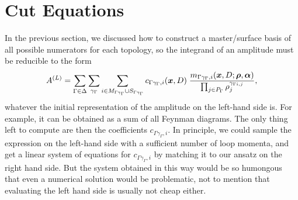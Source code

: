 \section{Cut Equations}
\label{sec:cut_equations}
{

In the previous section, we discussed how to construct a master/surface basis
of all possible numerators for each topology, so the integrand of an amplitude must 
be reducible to the form
\begin{equation} \label{eq:unitarity_ansatz}
  A^{(L)} =  
  \sum_{\Gamma \in \Delta} \sum_{\gamma_\Gamma} \sum_{i \in M_{\Gamma\gamma_\Gamma} \cup S_{\Gamma\gamma_\Gamma}} c_{\Gamma\gamma_\Gamma, i}(\vb*{x},D) \;
  \frac{m_{\Gamma\gamma_\Gamma, i} (\vb*{x},D;\vb*{\rho},\vb*{\alpha}) }%
    {\prod_{j\in P_\Gamma} \rho_j^{\gamma_{\Gamma i, j}}},
\end{equation}
whatever the initial representation of the amplitude on the left-hand side is.
For example, it can be obtained as a sum of all Feynman diagrams.
The only thing left to compute are then the coefficients $c_{\Gamma\gamma_\Gamma, i}$.
In principle, we could sample the expression on the left-hand side with a sufficient number of loop momenta,
and get a linear system of equations for $c_{\Gamma\gamma_\Gamma, i}$ by matching it to our ansatz on the right hand side.
But the system obtained in this way would be so humongous that even a numerical solution would be problematic,
not to mention that evaluating the left hand side is usually not cheap either.

}
